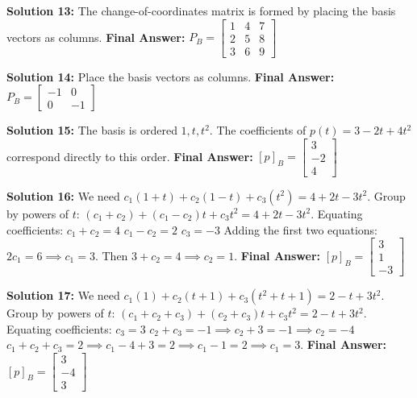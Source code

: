 \documentclass{article}
\begin{document}
\vspace{0.3cm}
\textbf{Solution 13:} The change-of-coordinates matrix is formed by placing the basis vectors as columns.
\textbf{Final Answer:} $P_B = \begin{bmatrix} 1 & 4 & 7 \\ 2 & 5 & 8 \\ 3 & 6 & 9 \end{bmatrix}$

\vspace{0.3cm}
\textbf{Solution 14:} Place the basis vectors as columns.
\textbf{Final Answer:} $P_B = \begin{bmatrix} -1 & 0 \\ 0 & -1 \end{bmatrix}$

\vspace{0.3cm}
\textbf{Solution 15:} The basis is ordered $1, t, t^2$. The coefficients of $p(t) = 3 - 2t + 4t^2$ correspond directly to this order.
\textbf{Final Answer:} $[p]_B = \begin{bmatrix} 3 \\ -2 \\ 4 \end{bmatrix}$

\vspace{0.3cm}
\textbf{Solution 16:} We need $c_1(1+t) + c_2(1-t) + c_3(t^2) = 4 + 2t - 3t^2$.
Group by powers of $t$: $(c_1 + c_2) + (c_1 - c_2)t + c_3t^2 = 4 + 2t - 3t^2$.
Equating coefficients:
$c_1 + c_2 = 4$
$c_1 - c_2 = 2$
$c_3 = -3$
Adding the first two equations: $2c_1 = 6 \implies c_1 = 3$. Then $3 + c_2 = 4 \implies c_2 = 1$.
\textbf{Final Answer:} $[p]_B = \begin{bmatrix} 3 \\ 1 \\ -3 \end{bmatrix}$

\vspace{0.3cm}
\textbf{Solution 17:} We need $c_1(1) + c_2(t+1) + c_3(t^2+t+1) = 2 - t + 3t^2$.
Group by powers of $t$: $(c_1 + c_2 + c_3) + (c_2 + c_3)t + c_3t^2 = 2 - t + 3t^2$.
Equating coefficients:
$c_3 = 3$
$c_2 + c_3 = -1 \implies c_2 + 3 = -1 \implies c_2 = -4$
$c_1 + c_2 + c_3 = 2 \implies c_1 - 4 + 3 = 2 \implies c_1 - 1 = 2 \implies c_1 = 3$.
\textbf{Final Answer:} $[p]_B = \begin{bmatrix} 3 \\ -4 \\ 3 \end{bmatrix}$
\end{document}
